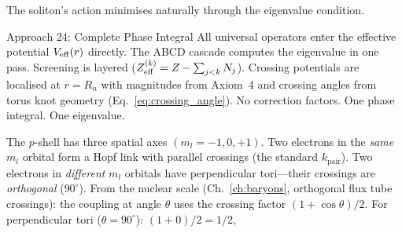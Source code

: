 The soliton's action minimises naturally
through the eigenvalue condition.

\begin{resultbox}{Approach 24: Complete Phase
Integral}
All universal operators enter the effective
potential $V_{\rm eff}(r)$ directly.  The ABCD
cascade computes the eigenvalue in one pass.
Screening is layered
($Z_{\rm eff}^{(k)} = Z - \sum_{j<k} N_j$).
Crossing potentials are localised at $r = R_n$
with magnitudes from Axiom~4 and crossing
angles from torus knot geometry
(Eq.~\ref{eq:crossing_angle}).  No correction
factors.  One phase integral.  One eigenvalue.
\end{resultbox}


The $p$-shell has three spatial axes $(m_l = -1, 0, +1)$.
Two electrons in the \emph{same} $m_l$ orbital form a Hopf link
with parallel crossings (the standard $k_{\text{pair}}$).
Two electrons in \emph{different} $m_l$ orbitals have perpendicular
tori---their crossings are \emph{orthogonal} ($90^\circ$).
From the nuclear scale (Ch.~\ref{ch:baryons}, orthogonal flux tube
crossings): the coupling at angle $\theta$ uses the
crossing factor $(1+\cos\theta)/2$.  For perpendicular
tori ($\theta = 90^\circ$): $(1+0)/2 = 1/2$,
